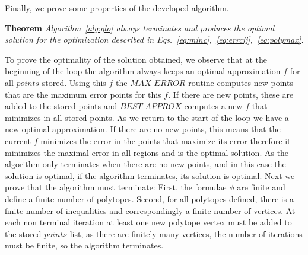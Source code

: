 Finally, we prove some properties of the developed algorithm.

{\bf Theorem} {\it Algorithm~\ref{alg:glo} always terminates and produces the optimal solution for the optimization described in Eqs.~\ref{eq:minc},~\ref{eq:errcij},~\ref{eq:polymax}.} 

To prove the optimality of the solution obtained, we observe that at the beginning of the loop the algorithm always keeps an optimal approximation $f$ for all $points$ stored. Using this $f$ the $MAX\_ERROR$ routine computes new points that are the maximum error points for this $f$. If there are new points, these are added to the stored points and $BEST\_APPROX$ computes a new $f$ that minimizes in all stored points. As we return to the start of the loop we have a new optimal approximation. If there are no new points, this means that the current $f$ minimizes the error in the points that maximize its error therefore it minimizes the maximal error in all regions and is the optimal solution.  As the algorithm only terminates when there are no new points, and in this case the solution is optimal, if the algorithm terminates, its solution is optimal.
 Next we prove that the algorithm must terminate: First, the formulae $\phi$  are finite and define a finite number of polytopes. Second, for all polytopes defined, there is a finite number of inequalities and correspondingly a finite number of vertices. At each non terminal iteration at least one new polytope vertex must be added to the stored $points$ list, as there are finitely many vertices, the number of iterations must be finite, so the algorithm terminates.





